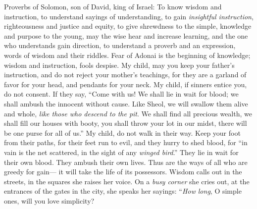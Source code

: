 
\begin{biblechapter} %
 Proverbs of Solomon, son of David, king of Israel:
\verse To know wisdom and instruction, 
to understand sayings of understanding,
\verse to gain \textit{insightful instruction}, 
righteousness and justice and equity,
\verse to give shrewdness to the simple, 
knowledge and purpose to the young,
\verse may the wise hear and increase learning, 
and the one who understands gain direction,
\verse to understand a proverb and an expression, 
words of wisdom and their riddles.
\verse Fear of Adonai is the beginning of knowledge; 
wisdom and instruction, fools despise.
 My child, may you keep your father’s instruction, 
and do not reject your mother’s teachings,
\verse for they are a garland of favor for your head, 
and pendants for your neck.
\verse My child, if sinners entice you, do not consent.
\verse If they say, 
“Come with us! 
We shall lie in wait for blood; 
we shall ambush the innocent without cause.
\verse Like Sheol, we will swallow them alive 
and whole, \textit{like those who descend to the pit}.
\verse We shall find all precious wealth, 
we shall fill our houses with booty,
\verse you shall throw your lot in our midst, 
there will be one purse for all of us.”
\verse My child, do not walk in their way. 
Keep your foot from their paths,
\verse for their feet run to evil, 
and they hurry to shed blood,
\verse for “in vain is the net scattered, 
in the sight of any \textit{winged bird}.”
\verse They lie in wait for their own blood. 
They ambush their own lives.
\verse Thus are the ways of all who are greedy for gain— 
it will take the life of its possessors.
 Wisdom calls out in the streets, 
in the squares she raises her voice.
\verse On a \textit{busy corner} she cries out, 
at the entrances of the gates in the city, she speaks her sayings:
\verse “\textit{How long}, O simple ones, will you love simplicity? 

\end{biblechapter}
